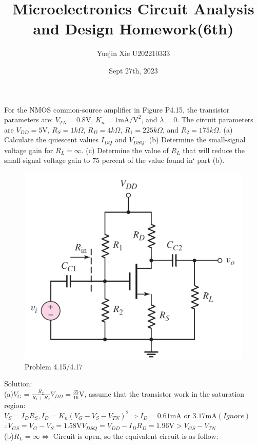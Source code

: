 \documentclass[a4paper,11pt,UTF8]{article}
\title{Microelectronics Circuit Analysis and Design Homework(6th)}
\author{Yuejin Xie \quad U202210333}
\date{Sept 27th, 2023}
\begin{document}
\maketitle
{} For the NMOS common-source amplifier in Figure P4.15, the transistor
parameters are: $V_{T N }= 0.8$V, $K_n = 1\text{mA/V}^2$, and $\lambda = 0$. The circuit parameters
are $V_{DD} = 5 $V, $R_S = 1 k\Omega$, $R_D = 4 k\Omega$, $R_1 = 225 k\Omega$, and
$R_2 = 175 k\Omega$. (a) Calculate the quiescent values $I_{DQ}$ and $V_{DSQ}$. (b) Determine
the small-signal voltage gain for $R_L =\infty$. (c) Determine the value of
$R_L$ that will reduce the small-signal voltage gain to 75 percent of the value
found in` part (b).\\
\begin{figure}[H] 
	\centering 
	\includegraphics[scale=0.3]{MD4.15.png}
	\caption{Problem 4.15/4.17}
\end{figure}
\noindent Solution:\\
(a)$\displaystyle V_{G}=\frac{R_2}{R_1+R_2}V_{DD}=\frac{35}{16}$V, assume that the transistor work in the saturation region:\\
$V_{S}=I_DR_S, I_D=K_n(V_G-V_S-V_{TN})^2\Rightarrow I_D=0.61\text{mA or }3.17\text{mA}(Ignore)$\\
$\therefore V_{GS}=V_G-V_S=1.58\mathrm{V}V_{DSQ}=V_{DD}-I_DR_D=1.96\mathrm{V}>V_{GS}-V_{TN}$\\
(b)$R_L=\infty \Leftrightarrow$ Circuit is open, so the equivalent circuit is as follow:\\
\end{document}
